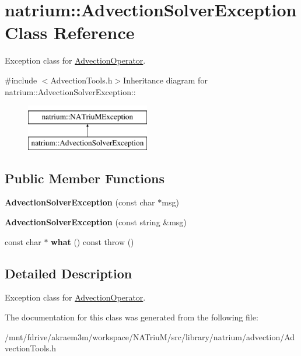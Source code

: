 \hypertarget{classnatrium_1_1AdvectionSolverException}{
\section{natrium::AdvectionSolverException Class Reference}
\label{classnatrium_1_1AdvectionSolverException}
}


Exception class for \hyperlink{classnatrium_1_1AdvectionOperator}{AdvectionOperator}.  


{\ttfamily \#include $<$AdvectionTools.h$>$}Inheritance diagram for natrium::AdvectionSolverException::\begin{figure}[H]
\begin{center}
\leavevmode
\includegraphics[height=2cm]{classnatrium_1_1AdvectionSolverException}
\end{center}
\end{figure}
\subsection*{Public Member Functions}
\begin{DoxyCompactItemize}
\item 
\hypertarget{classnatrium_1_1AdvectionSolverException_a443084a12dee879bdfbfc900202a0706}{
{\bfseries AdvectionSolverException} (const char $\ast$msg)}
\label{classnatrium_1_1AdvectionSolverException_a443084a12dee879bdfbfc900202a0706}

\item 
\hypertarget{classnatrium_1_1AdvectionSolverException_a9cda3faa279e3528f96c3780a91545bd}{
{\bfseries AdvectionSolverException} (const string \&msg)}
\label{classnatrium_1_1AdvectionSolverException_a9cda3faa279e3528f96c3780a91545bd}

\item 
\hypertarget{classnatrium_1_1AdvectionSolverException_aeb13fafe3f75de7cfd4e282a8a0fb5b0}{
const char $\ast$ {\bfseries what} () const   throw ()}
\label{classnatrium_1_1AdvectionSolverException_aeb13fafe3f75de7cfd4e282a8a0fb5b0}

\end{DoxyCompactItemize}


\subsection{Detailed Description}
Exception class for \hyperlink{classnatrium_1_1AdvectionOperator}{AdvectionOperator}. 

The documentation for this class was generated from the following file:\begin{DoxyCompactItemize}
\item 
/mnt/fdrive/akraem3m/workspace/NATriuM/src/library/natrium/advection/AdvectionTools.h\end{DoxyCompactItemize}
